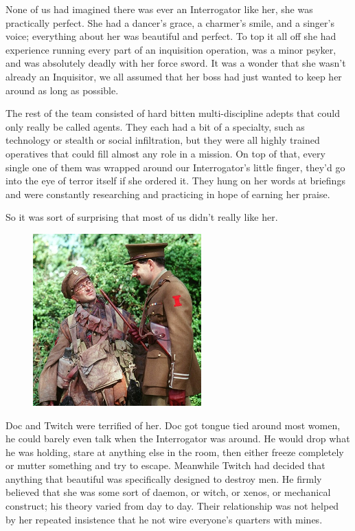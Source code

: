 None of us had imagined there was ever an Interrogator like her, she was practically perfect. 
She had a dancer’s grace, a charmer’s smile, and a singer’s voice; everything about her was beautiful and perfect. 
To top it all off she had experience running every part of an inquisition operation, was a minor psyker, and was absolutely deadly with her force sword. 
It was a wonder that she wasn’t already an Inquisitor, we all assumed that her boss had just wanted to keep her around as long as possible.

The rest of the team consisted of hard bitten multi-discipline adepts that could only really be called agents. 
They each had a bit of a specialty, such as technology or stealth or social infiltration, but they were all highly trained operatives that could fill almost any role in a mission. 
On top of that, every single one of them was wrapped around our Interrogator’s little finger, they’d go into the eye of terror itself if she ordered it. 
They hung on her words at briefings and were constantly researching and practicing in hope of earning her praise. 

So it was sort of surprising that most of us didn’t really like her.

\begin{figure}
	\begin{center}
		\includegraphics[width=\figwidth]{pics/5/3.png}
	\end{center}
\end{figure}
Doc and Twitch were terrified of her. Doc got tongue tied around most women, he could barely even talk when the Interrogator was around. 
He would drop what he was holding, stare at anything else in the room, then either freeze completely or mutter something and try to escape. 
Meanwhile Twitch had decided that anything that beautiful was specifically designed to destroy men.
He firmly believed that she was some sort of daemon, or witch, or xenos, or mechanical construct; 
his theory varied from day to day. Their relationship was not helped by her repeated insistence that he not wire everyone’s quarters with mines.

